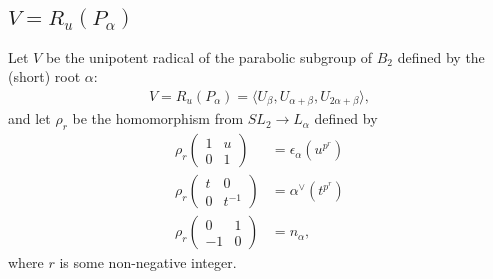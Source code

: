 \subsection{$V = R_u(P_\alpha)$}
\label{b2:alpha}

Let $V$ be the unipotent radical of the parabolic subgroup of $B_2$ defined by the (short) root $\alpha$:
\begin{align*}
V=R_u(P_\alpha)=\langle U_\beta, U_{\alpha + \beta}, U_{2\alpha + \beta} \rangle,
\end{align*}
and let $\rho_r$ be the homomorphism from $SL_2 \rightarrow L_\alpha$ defined by
\begin{align*}
\rho_r\left(\begin{matrix} 1 & u \\ 0 & 1\end{matrix}\right) &= \epsilon_\alpha(u^{p^r}) \\
\rho_r\left(\begin{matrix} t & 0 \\ 0 & t^{-1}\end{matrix}\right) &= \alpha ^\vee(t^{p^r}) \\
\rho_r\left(\begin{matrix} 0 & 1 \\ -1 & 0\end{matrix}\right) &= n_ \alpha,
\end{align*}
where $r$ is some non-negative integer.

